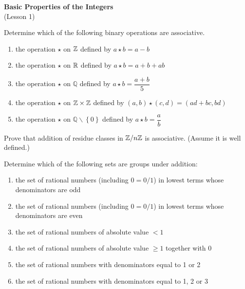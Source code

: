 \documentclass[
    11pt,a4paper,
]{exam}
\begin{document}
\def\contador{Problem Set 1}


\begin{center}
    {\bfseries\Large
        Basic Properties of the Integers}\\
    (Lesson 1)
\end{center}


\begin{questions}
    \question Determine which of the following binary operations are associative.
    \begin{enumerate}[label=(\alph*)]
        \item the operation \(\star\) on \(\mathbb{Z}\) defined by \(a\star b  = a-b\)
        \item the operation \(\star\) on \(\mathbb{R}\) defined by \(a\star b  = a+b+ab\)
        \item the operation \(\star\) on \(\mathbb{Q}\) defined by \(a\star b  = \dfrac{a+b}{5}\)
        \item the operation \(\star\) on \(\mathbb{Z}\times\mathbb{Z}\) defined by \((a , b) \star (c,d)  = (ad+bc, bd)\)
        \item the operation \(\star\) on \(\mathbb{Q}\backslash\left\{ 0 \right\}\) defined by \(a\star b = \dfrac{a}{b} \)
    \end{enumerate}
    
    \question 
    Prove that addition of residue classes in \(\mathbb{Z} / n \mathbb{Z}\) is associative. (Assume it is well defined.)
    
    
    \question
    Determine which of the following sets are groups under addition:
    \begin{enumerate}[label=(\alph*)]
        \item the set of rational numbers (including \(0=0 / 1\)) in lowest terms whose denominators are odd
        \item the set of rational numbers (including \(0=0 / 1\)) in lowest terms whose denominators are even
        \item the set of rational numbers of absolute value \(<1\)
        \item the set of rational numbers of absolute value \(\geq 1\) together with 0
        \item the set of rational numbers with denominators equal to 1 or 2
        \item the set of rational numbers with denominators equal to 1, 2 or 3 
    \end{enumerate}
    
    
    

\end{questions}
\end{document}
